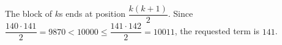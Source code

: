 The block of $k$s ends at position $\dfrac{k(k+1)}{2}$. Since $\dfrac{140\cdot141}{2}=9870<10000\le\dfrac{141\cdot142}{2}=10011$, the requested term is $\boxed{141}$.
